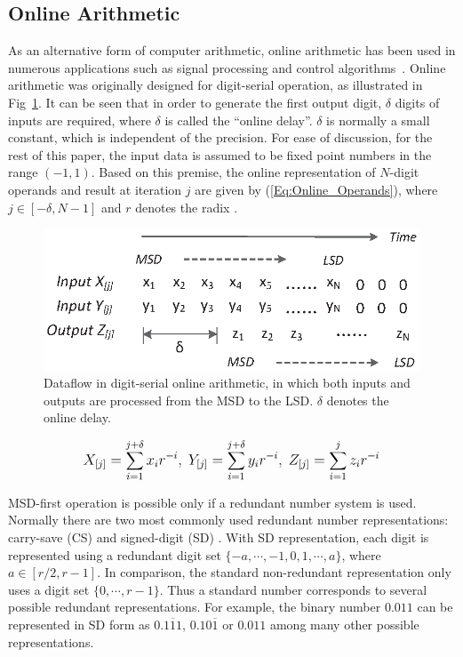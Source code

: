 \documentclass[10pt, conference, compsocconf]{IEEEtran}
\begin{document}
\subsection{Online Arithmetic}

As an alternative form of computer arithmetic, online arithmetic has been used in numerous applications such as signal processing and control algorithms~\cite{Online_FPGADSP,Online_Control}. Online arithmetic was originally designed for digit-serial operation, as illustrated in Fig~\ref{Fig:OnlineDataFlow}. It can be seen that in order to generate the first output digit, $\delta$ digits of inputs are required, where $\delta$ is called the ``online delay''. $\delta$ is normally a small constant, which is independent of the precision. For ease of discussion, for the rest of this paper, the input data is assumed to be fixed point numbers in the range $(-1,1)$. Based on this premise, the online representation of $N$-digit operands and result at iteration $j$ are given by (\ref{Eq:Online_Operands}), where $j\in[-\delta,N-1]$ and $r$ denotes the radix \cite{Ercegovac_Book}.
%
\begin{figure}[tbp]
  \centering
  \includegraphics[width=.42\textwidth]{./figures/OnlineArithmetic_DataFlow.eps}
  \caption{Dataflow in digit-serial online arithmetic, in which both inputs and outputs are processed from the MSD to the LSD. $\delta$ denotes the online delay.}
  \vspace{-2ex}
  \label{Fig:OnlineDataFlow}
\end{figure}
%
\begin{eqnarray}\label{Eq:Online_Operands}
\footnotesize
  X_{[j]}=\sum_{i=1}^{j+\delta}x_ir^{-i},~Y_{[j]}=\sum_{i=1}^{j+\delta}y_ir^{-i},~Z_{[j]}=\sum_{i=1}^{j}z_ir^{-i}
\normalsize
\end{eqnarray}

MSD-first operation is possible only if a redundant number system is used. Normally there are two most commonly used redundant number representations: carry-save (CS) \cite{CSadder} and signed-digit (SD) \cite{RedundantNumber}. With SD representation, each digit is represented using a redundant digit set $\{-a, \cdots,-1,0, 1, \cdots, a\}$, where $a\in[r/2,r-1]$. In comparison, the standard non-redundant representation only uses a digit set $\{0,\cdots,r-1\}$. Thus a standard number corresponds to several possible redundant representations. For example, the binary number $0.011$ can be represented in SD form as $0.1\overline{1}1$, $0.10\overline{1}$ or $0.011$ among many other possible representations.
\end{document}
